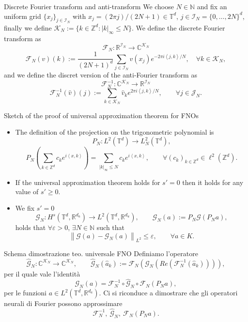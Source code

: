 \documentclass{beamer}
\newcommand{\numberset}{\mathbb}
\newcommand{\N}{\numberset{N}}
\newcommand{\Z}{\numberset{Z}}
\newcommand{\R}{\numberset{R}}
\newcommand{\C}{\numberset{C}}
\begin{document}

\begin{frame}[noframenumbering]{Discrete Fourier transform and anti-transform}
	We choose $ N \in \N $ and fix an uniform grid $ \{x_j\}_{j \in \mathcal{I}_N} $ with $ x_j = (2\pi j)/(2N+1) \in \mathbb{T}^d $, $ j \in \mathcal{I}_N = \{0, \dots, 2N\}^{d} $, finally we define $\mathcal{K}_N := \{k \in \Z^d : |k|_{\infty} \le N\}$.
	We define the discrete Fourier transform as
	\[ \mathcal{F}_{N}: \R^{\mathcal{I}_N} \to \C^{\mathcal{K}_N}\]\[ \mathcal{F}_{N}(v)(k) := \frac{1}{(2N+1)^{d}} \sum_{j \in \mathcal{I}_N}v(x_j) e^{-2\pi i \left\langle j, k \right\rangle/N }, \quad \forall k \in \mathcal{K}_N, \]
	and we define the discret version of the anti-Fourier transform as
	\[ \mathcal{F}_{N}^{-1}: \C^{\mathcal{K}_N} \to \R^{\mathcal{I}_N}\]\[ \mathcal{F}_{N}^{-1}(\widehat{v})(j) := \sum_{k \in \mathcal{K}_N} \widehat{v}_k e^{2\pi i \left\langle j, k \right\rangle/N }, \qquad \forall j \in \mathcal{J}_N. \]
\end{frame}


\begin{frame}[noframenumbering]{Sketch of the proof of universal approximation theorem for FNOs}
	\centering
	\begin{itemize}
		\item The definition of the projection on the trigonometric polynomial is
		\[ P_N: L^{2}(\mathbb{T}^d) \to L^{2}_N(\mathbb{T}^d),  \]
		\[ P_N\left(\sum_{k \in \Z^d} c_k e^{i \left\langle x, k \right\rangle } \right) = \sum_{|k|_{\infty}\le N} c_k e^{i \left\langle x, k \right\rangle }, \qquad \forall (c_k)_{k \in \Z^d} \in \ell^2(\Z^d). \]
		\item If the universal approximation theorem holds for $ s'=0 $ then it holds for any value of $ s' \ge 0 $.
		\item We fix $ s' = 0 $  \[ \mathcal{G}_{N}: H^{s}(\mathbb{T}^d, \R^{d_a}) \to L^2(\mathbb{T}^d, \R^{d_u}), \qquad \mathcal{G}_{N}(a):= P_N  \mathcal{G} (P_Na), \]
		holds that $ \forall \varepsilon > 0 $, $ \exists N \in \N $ such that
		\[ \left\|\mathcal{G}(a) - \mathcal{G}_N(a) \right\|_{L^2} \le \varepsilon, \qquad \forall a \in K. \]
	\end{itemize}
\end{frame}


\begin{frame}[noframenumbering]{Schema dimostrazione teo. universale FNO}
	Definiamo l'operatore
	\[ \widehat{\mathcal{G}}_N: \C^{\mathcal{K}_N} \to\C^{\mathcal{K}_N}, \qquad \widehat{\mathcal{G}}_N(\widehat{a}_k) := \mathcal{F}_N (\mathcal{G}_N ( Re (\mathcal{F}_N^{-1}(\widehat{a}_k)))), \]
	per il quale vale l'identità
	\[ \mathcal{G}_N (a) = \mathcal{F}_N^{-1} \circ \widehat{\mathcal{G}}_N \circ \mathcal{F}_N (P_Na), \]
	per le funzioni $  a \in L^2(\mathbb{T}^d, \R^{d_a}) $. Ci si riconduce a dimostrare che gli operatori neurali di Fourier possono approssimare
	\[ \mathcal{F}_N^{-1}, \ \widehat{\mathcal{G}}_N , \ \mathcal{F}_N (P_Na). \]
\end{frame}
\end{document}

